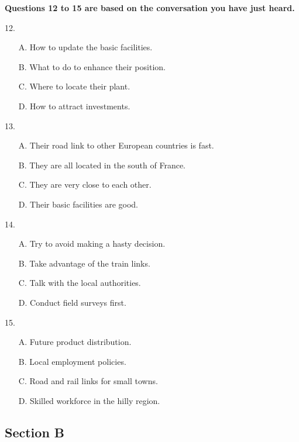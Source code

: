 \documentclass[UTF8,11pt]{ctexart}
\begin{document}
\textbf{Questions 12 to 15 are based on the conversation you have just heard.}


12.


\begin{itemize}[leftmargin=2em,itemsep=.2em,topsep=.4em]\item[A.] How to update the basic facilities.
\item[B.] What to do to enhance their position.
\item[C.] Where to locate their plant.
\item[D.] How to attract investments.
\end{itemize}

13.


\begin{itemize}[leftmargin=2em,itemsep=.2em,topsep=.4em]\item[A.] Their road link to other European countries is fast.
\item[B.] They are all located in the south of France.
\item[C.] They are very close to each other.
\item[D.] Their basic facilities are good.
\end{itemize}

14.


\begin{itemize}[leftmargin=2em,itemsep=.2em,topsep=.4em]\item[A.] Try to avoid making a hasty decision.
\item[B.] Take advantage of the train links.
\item[C.] Talk with the local authorities.
\item[D.] Conduct field surveys first.
\end{itemize}

15.


\begin{itemize}[leftmargin=2em,itemsep=.2em,topsep=.4em]\item[A.] Future product distribution.
\item[B.] Local employment policies.
\item[C.] Road and rail links for small towns.
\item[D.] Skilled workforce in the hilly region.
\end{itemize}

\subsection*{\textbf{Section B}}
\end{document}

